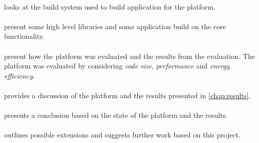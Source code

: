 \paragraph{} looks at the build system used to build application for the {\rg} platform.

\paragraph{} present some high level libraries and some application build on the core {\rg} functionality.

\paragraph{} present how the platform was evaluated and the results from the evaluation.
The platform was evaluated by considering \emph{code size}, \emph{performance} and \emph{energy efficiency}.

\paragraph{} provides a discussion of the platform and the results presented in \autoref{chap:results}.

\paragraph{} presents a conclusion based on the state of the platform and the results.

\paragraph{} outlines possible extensions and suggests further work based on this project.

